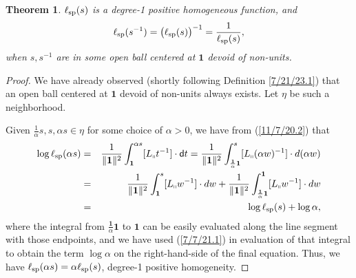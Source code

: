 \documentclass{amsart}
\numberwithin{equation}{section}
\newtheorem{theorem}{Theorem}
\theoremstyle{definition}
\numberwithin{theorem}{section}
\begin{document}
\begin{theorem}\label{9/24/23.1} $ \ell_{\rm sp}(s)$ is a degree-1 positive homogeneous function, and
\begin{equation}\label{5/23/23.3}  \ell_{\rm sp}(s^{-1}) = \big(\ell_{\rm sp}(s)\big)^{-1} = \frac{1}{\ell_{\rm sp}(s)}, \end{equation} when $s,s^{-1}$ are in some open ball centered at $\mathbf{1}$ devoid of non-units. \end{theorem}

\begin{proof} We have already observed (shortly following Definition \ref{7/21/23.1}) that an open ball centered at $\mathbf{1}$ devoid of non-units always exists.  Let $\eta$  be such a neighborhood.

Given $\frac{1}{\alpha}s,s,\alpha s\in\eta$ for some choice of $\alpha>0$, we have from (\ref{11/7/20.2}) that
\begin{eqnarray}\nonumber  \log\ell_{\rm sp}(\alpha s) &=&  \frac{1}{\|{\bf 1}\|^2}\int_{\bf 1}^{\alpha s} [L_{\shortparallel}t^{-1}]\cdot {\sf d}t = \frac{1}{\|{\bf 1}\|^2}\int_{\frac{\mathbf{1}}{\alpha}\mathbf{1}}^{s} [L_{\shortparallel}(\alpha w)^{-1}]\cdot d(\alpha w)  \\ \nonumber &=&  \frac{1}{\|{\bf 1}\|^2}\int_{\mathbf{1}}^{s} [L_{\shortparallel}w^{-1}]\cdot dw + \frac{1}{\|{\bf 1}\|^2}\int_{\frac{\mathbf{1}}{\alpha} \mathbf{1}}^{\mathbf{1}} [L_{\shortparallel}w^{-1}]\cdot dw  \\ &=& \log \ell_{\rm sp}(s) + \log\alpha, \label{4/2/23.1}
\end{eqnarray} where the integral from $\frac{\mathbf{1}}{\alpha} \mathbf{1}$ to $\mathbf{1}$ can be easily evaluated along the line segment with those endpoints, and we have used (\ref{7/7/21.1}) in evaluation of that integral to obtain the term $\log \alpha$ on the right-hand-side of the final equation.  Thus, we have $\ell_{\rm sp}(\alpha s) = \alpha\ell_{\rm sp}(s)$, degree-1 positive homogeneity.


\end{proof}
\end{document}
